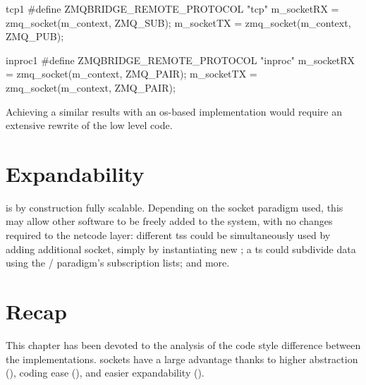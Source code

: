 \begin{codelist}{\gls{tcp}}{1}
#define ZMQBRIDGE_REMOTE_PROTOCOL "tcp"
m_socketRX = zmq_socket(m_context, ZMQ_SUB);
m_socketTX = zmq_socket(m_context, ZMQ_PUB);
\end{codelist}

\begin{codelist}{inproc}{1}
#define ZMQBRIDGE_REMOTE_PROTOCOL "inproc"
m_socketRX = zmq_socket(m_context, ZMQ_PAIR);
m_socketTX = zmq_socket(m_context, ZMQ_PAIR);
\end{codelist}

\FLOATnoindent Achieving a similar results with an \gls{os}-based implementation would require an extensive rewrite of the low level code.

\section{Expandability}\label{sc:code:expandability}

 is by construction fully scalable. Depending on the socket paradigm used, this may allow other software to be freely added to the system, with no changes required to the \gls{netcode} layer: different \glspl{ts} could be simultaneously used by adding additional socket, simply by instantiating new ; a \gls{ts} could subdivide data using the / paradigm's subscription lists; and more.

\section{Recap}\label{sc:code:recap}

This chapter has been devoted to the analysis of the code style difference between the implementations.  sockets have a large advantage thanks to higher abstraction (), coding ease (), and easier expandability ().
